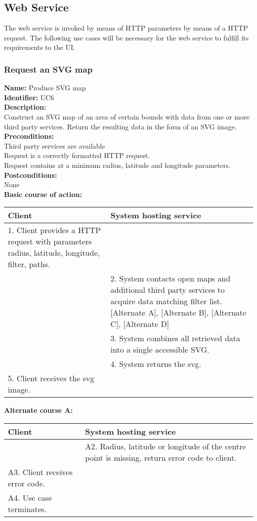 \documentclass[11pt,twoside,a4paper]{article}
\begin{document}
\subsection{Web Service}

The web service is invoked by means of HTTP parameters by means of a
HTTP request. The following use cases will be necessary for the web
service to fulfill its requirements to the UI.

\subsubsection{Request an SVG map}
\noindent
\textbf{Name:} Produce SVG map\\
\textbf{Identifier:} UC6\\
\textbf{Description:}\\
Construct an SVG map of an area of certain bounds with data from one or
more third party services. Return the resulting data in the form of an
SVG image.\\
\textbf{Preconditions:}\\
Third party services are available\\
Request is a correctly formatted HTTP request.\\
Request contains at a minimum radius, latitude and longitude parameters.\\
\textbf{Postconditions:}\\
None\\

\noindent
\textbf{Basic course of action:}\\
\begin{tabularx}{\textwidth}{ |X|X| }
  \textbf{Client} & \textbf{System hosting service}\\
  \hline
  1. Client provides a HTTP request with parameters radius, latitude, longitude,
  filter, paths. & \\
  \hline
  & 2. System contacts open maps and additional third party services to acquire data matching
  filter list. [Alternate A], [Alternate B], [Alternate C], [Alternate D]\\
  \hline
  & 3. System combines all retrieved data into a single accessible
  SVG.\\
  \hline
  & 4. System returns the svg.\\
  \hline
  5. Client receives the svg image. & \\
  \hline
\end{tabularx}

\noindent
\textbf{Alternate course A:}\\
\begin{tabularx}{\textwidth}{ |X|X| }
  \textbf{Client} & \textbf{System hosting service}\\
  \hline
  & A2. Radius, latitude or longitude of the centre point is missing, return
  error code to client.\\
  \hline
  A3. Client receives error code. & \\
  \hline
  A4. Use case terminates. & \\
  \hline
\end{tabularx}
\end{document}
